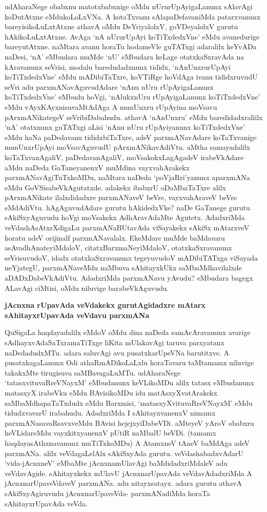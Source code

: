 udAharaNege obabxnu matotxbabxnige oMdu nUrurUpAyigaLanunx sAlavAgi koDutAtxne eMdukoLoLxVNa. A kotaTxvanu sAlapaDefavaniMda patarxvanunx bareyisikoLuLxtAtxne athavA oMdu DeYriyalolxV, goVDeyalolxV gurutu hAkikoLuLxtAtxne. AvAga `nA nUrurUpAyi koTiTxdedxVne' eMdu avanedurige bareyutAtxne. naMtara avanu horaTu hodameVle guTATxgi adaralilx keYvADa naDesi, `nA' eMbudara muMde `nU' eMbudara keLage otatxkaSxravAda na kAravanunx seVrisi, modalu baredudadxnunx tididx, `nAnUnxrurUpAyi koTiTxdedxVne' eMdu mADibiTaTxre, koVTiRge hoVdAga ivanu tididxruvudU seVri adu parxmANavAguvudAdare `nAnu nUru rUpAyigaLanunx koTiTxdedxVne' eMbudu hoVgi, `nAlukxnUru rUpAyigaLanunx koTiTxdedxVne' eMdu vAyxKAyxnisuvaMtAdAga A munUnxru rUpAyina moVsavu pArxmANikategeV seVribiDabahudu. athavA `nAnUnxru' eMdu baredidadxraliilx `nA' otatxnunx guTATxgi aLisi `nAnu nUru rUpAyiyanunx koTiTxdedxVne' eMdu haNa paDedavanu tididxbiTaTxre, adeV parxmANavAdare koTaTxvanige munUnxrUpAyi moVsavAguvudU pArxmANikavAdiVtu. aMtha samayadalilx koTaTxvanAgaliV, paDedavanAgaliV, moVsakokxLagAgadeV irabeVkAdare aMdu naDeda GaTaneyanenxV muMdina vayxvahArakekx parxmANavAgiTuTxkoMDu, naMtara naDeda `poVjaRri'yanunx aparxmANa eMdu GoVSisabeVkAgutatxde. adakekx ibabxrU oDaMbaTaTxre alilx pArxmANikate ilalxdidadxre parxmANaveV beVre, vayxvahAraveV beVre eMdAdiVtu. hAgAguvudAdare gurutu hAkidedxVke? naDe GaTanege gurutu sAkiSxyAguvudu hoVgi moVsakekx AdhAravAdaMte Agutetx. AdadxriMda veVdashAsAtxrXdigaLu parxmANaBUtavAda viSayakekx sAkiSx mAtarxveV horatu adeV orijinalf parxmANavalalx. EkeMdare muMde baMdavaru asAvadhAnateyiMdaloV, citatxBarxmaNeyiMdaloV, otatxkaSxravanunx seVrisuvudoV, idadx otatxkaSxravanunx tegeyuvudoV mADibiTATxga viSayada neYjategU, parxmANaveMdu naMbuva sAhitayxkUkx saMbaMdhavilalxde aDADxDabeVkAdiVtu. AdadxriMda parxmANavu yAvudu? eMbudara bagegx ALavAgi ciMtisi, oMdu niluvige barabeVkAguvudu.

{\bf jAcnxna rUpavAda veVdakekx gurutAgidadxre mAtarx sAhitayxrUpavAda veVdavu parxmANa}

QuSigaLa haqdayadalilx eMdoV oMdu dina naDeda samAcAravanunx avarige sAdhayxvAdaSaTxramaTiTxge liKita mUlakavAgi taruva parxyatanx naDedadudxMTu. adara saluvAgi avu pusatxkarUpeVNa barutitxve. A pusatxkagaLanunx Odi athaRmADikoLaLxlu horaTavaru taMtamamx niluvige takakxMte tirugisuva saMBavagaLuMTu. udAharaNege `tatasxvituvaRreVNayxM' eMbudanunx keVLikoMDu alilx tatasx eMbudanunx matasxyX irabeVku eMdu BAvisikoMDu idu matAsxyXvatArakekx saMbaMdhapaTaTxdudx eMdu Barxmisi, `matasxyXvituvaRreVNayxM' eMdu tidudxvavarU irabahudu. AdadxriMda I sAhitayxvanenxV nimamx parxmANasavaRsavxveMdu BAvisi hejejxyiDabeVDi. aMteyeV yAroV obabxru heVLidareMdu vayxkitxyanenxV pUtiR naMbalU beVDi. (tamamx haqdayasAthxnavanunx muTiTxkoMDu) A AtamxneV tAneV baMdAga adeV parxmANa. alilx veVdagaLelAlx sAkiSxyAda gurutu. veVdashabadxvAdarU `vida-jAcnxneV' eMbaMte jAcnxnamUlavAgi baMdidadxriMdaleV adu veVdavAgide. sAhitayxkekx mUlavU jAcnxnarUpavAda veVdavAdadxriMda A jAcnxnarUpaveVdaveV parxmANa. adu nitayxsatayx. adara gurutu athavA sAkiSxyAgiruvudu jAcnxnarUpaveVda- parxmANadiMda horaTa sAhitayxrUpavAda veVda.

